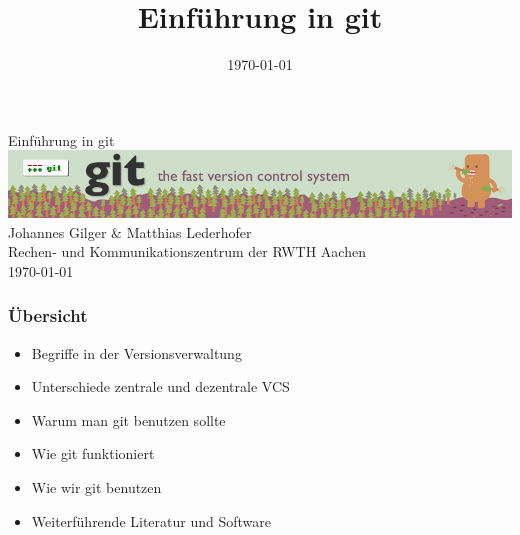 
 {
}

\usepackage[german]{babel}
\usepackage[utf8]{inputenc}
\usepackage{times}
\usepackage[T1]{fontenc}
\usepackage[right]{eurosym}
\usepackage{graphicx}
\usepackage{hyperref}
\hypersetup{pdftex=true, colorlinks=true, breaklinks=true, linkcolor=darkblue, menucolor=darkblue, pagecolor=darkblue, urlcolor=darkblue}

\title[Einführung in git]{Einführung in git}
\author[Gilger, Lederhofer]{}
\date[\today]{\today}



\begin{frame}
  \begin{center}
  \vspace{1cm}
  \Huge Einführung in git \\
  \vspace{1cm}
  \includegraphics[scale=0.4]{img/git-logo.png} \\
  \vspace{0.6cm}
  \Large Johannes Gilger \& Matthias Lederhofer \\
  \small Rechen- und Kommunikationszentrum der RWTH Aachen \\
  \vspace{1cm}
  \small \today
  \end{center}
\end{frame}

\begin{frame}
  \frametitle{Übersicht}
  \begin{itemize}
    \item Begriffe in der Versionsverwaltung
    \item Unterschiede zentrale und dezentrale VCS
    \item Warum man git benutzen sollte
    \item Wie git funktioniert
    \item Wie wir git benutzen
    \item Weiterführende Literatur und Software
  \end{itemize}
\end{frame}


